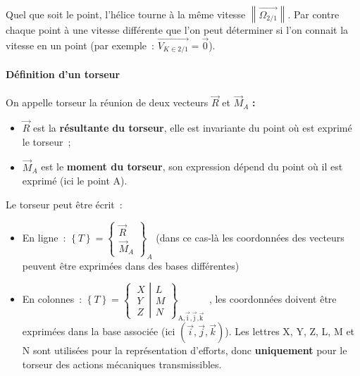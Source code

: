 Quel que soit le point, l'hélice tourne à la même vitesse
\(\left\| \overrightarrow{\Omega_{2/1}} \right\|\). Par contre chaque
point à une vitesse différente que l'on peut déterminer si l'on connait
la vitesse en un point (par exemple~:
\(\overrightarrow{V_{K \in 2/1}} = \overrightarrow{0}\)).

\paragraph*{Définition d'un torseur}\label{duxe9finition-dun-torseur}

On appelle torseur la réunion de deux vecteurs \(\overrightarrow{R}\) et
\({\overrightarrow{M}}_{A}\) \textbf{:}

\begin{itemize}
\item
  \(\overrightarrow{R}\) est la \textbf{résultante} \textbf{du torseur},
  elle est invariante du point où est exprimé le torseur~;
\item
  \({\overrightarrow{M}}_{A}\) est le \textbf{moment du torseur}, son
  expression dépend du point où il est exprimé (ici le point A).
\end{itemize}

Le torseur peut être écrit~:

\begin{itemize}
\item
  En ligne~: \(\left\{ T \right\} = \begin{Bmatrix}
  \overrightarrow{R} \\
  {\overrightarrow{M}}_{A}
  \end{Bmatrix}_{A}\) (dans ce cas-là les coordonnées des vecteurs
  peuvent être exprimées dans des bases différentes)
\item
  En colonnes~: \(\left\{ T \right\} = \left\{ \left. \ \begin{matrix}
  X \\
  Y \\
  Z
  \end{matrix} \right|\begin{matrix}
  L \\
  M \\
  N
  \end{matrix} \right\}_{\text{A,}\overrightarrow{\text{i}}\text{,}\overrightarrow{\text{j}}\text{,}\overrightarrow{\text{k}}}\)~,
  les coordonnées doivent être exprimées dans la base associée (ici
  \((\overrightarrow{i},\overrightarrow{j},\overrightarrow{k})\)). Les
  lettres X, Y, Z, L, M et N sont utilisées pour la représentation
  d'efforts, donc \textbf{uniquement} pour le torseur des actions
  mécaniques transmissibles.
\end{itemize}

